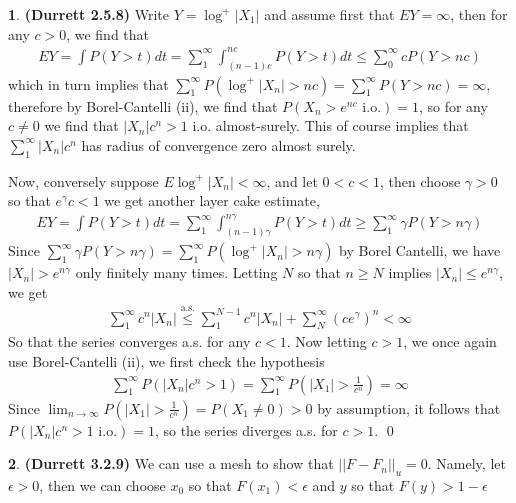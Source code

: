 \documentclass[10.5pt]{article}
\theoremstyle{definition}
\newtheorem{pb}{}
\newcommand{\abs}[1]{\lvert#1\rvert}
\newcommand{\norm}[1]{\lvert\lvert#1\rvert\rvert}
\begin{document}
    \begin{pb}\textbf{(Durrett 2.5.8)}
        Write \(Y = \log^+\abs{X_1}\) and assume first that \(EY = \infty\), then for any \(c > 0\), we find that
        \begin{align*}
            EY = \int P(Y>t)dt = \sum_1^\infty \int_{(n-1)c}^{nc} P(Y>t)dt \leq \sum_0^\infty cP(Y>nc)
        \end{align*}
        which in turn implies that \(\sum_1^\infty P(\log^+\abs{X_n} > nc) =  \sum_1^\infty P(Y > nc) = \infty\), therefore by Borel-Cantelli (ii), we find that \(P(X_n > e^{nc} \text{ i.o.}) = 1\), so for any \(c \neq 0\) we find that \(\abs{X_n}c^n > 1\) i.o. almost-surely. This of course implies that \(\sum_1^\infty \abs{X_n}c^n\) has radius of convergence zero almost surely.

        Now, conversely suppose \(E\log^+ \abs{X_n} < \infty\), and let \(0 < c < 1\), then choose \(\gamma > 0\) so that \(e^{\gamma}c < 1\) we get another layer cake estimate,
        \begin{align*}
            EY = \int P(Y>t)dt = \sum_1^\infty \int_{(n-1)\gamma}^{n\gamma} P(Y>t)dt \geq \sum_1^\infty \gamma P(Y>n\gamma)
        \end{align*}
        Since \(\sum_1^\infty \gamma P(Y>n\gamma) = \sum_1^\infty P(\log^+ \abs{X_n} > n\gamma)\) by Borel Cantelli, we have \(\abs{X_n} > e^{n\gamma}\) only finitely many times. Letting \(N\) so that \(n \geq N\) implies \(\abs{X_n} \leq e^{n\gamma}\), we get
        \begin{align*}
            \sum_1^\infty c^n\abs{X_n} \overset{\text{a.s.}}{\leq} \sum_1^{N-1}c^n\abs{X_n} + \sum_N^\infty (ce^{\gamma})^n < \infty
        \end{align*}
        So that the series converges a.s. for any \(c < 1\). Now letting \(c > 1\), we once again use Borel-Cantelli (ii), we first check the hypothesis
        \begin{align*}
            \sum_1^\infty P(\abs{X_n}c^n > 1) = \sum_1^\infty P(\abs{X_1} > \frac{1}{c^n}) = \infty
        \end{align*}
        Since \(\lim_{n\to\infty}P(\abs{X_1} > \frac{1}{c^n}) = P(X_1 \neq 0) > 0\) by assumption, it follows that \(P(\abs{X_n}c^n > 1 \text{ i.o.}) = 1\), so the series diverges a.s. for \(c > 1\). \qed
    \end{pb}
    \begin{pb}\textbf{(Durrett 3.2.9)}
        We can use a mesh to show that \(\norm{F - F_n}_u = 0\). Namely, let \(\epsilon > 0\), then we can choose \(x_0\) so that \(F(x_1) < \epsilon\) and \(y\) so that \(F(y) > 1 - \epsilon\)
    \end{pb}
\end{document}
